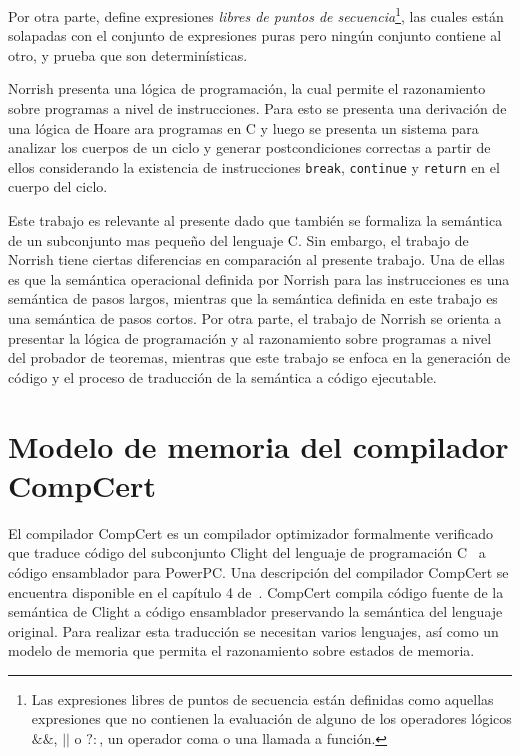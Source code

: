 Por otra parte, define expresiones \textit{libres de puntos de secuencia}\footnote{Las expresiones libres de puntos de secuencia están definidas como aquellas expresiones que no contienen la evaluación de alguno de los operadores lógicos $\&\&$, $||$ o $?:$, un operador coma o una llamada a función.}, las cuales están solapadas con el conjunto de expresiones puras pero ningún conjunto contiene al otro, y prueba que son determinísticas.

Norrish presenta una lógica de programación, la cual permite el razonamiento sobre programas a nivel de instrucciones.
Para esto se presenta una derivación de una lógica de Hoare ara programas en C y luego se presenta un sistema para analizar los cuerpos de un ciclo y generar postcondiciones correctas a partir de ellos considerando la existencia de instrucciones \verb|break|, \verb|continue| y \verb|return| en el cuerpo del ciclo.

Este trabajo es relevante al presente dado que también se formaliza la semántica de un subconjunto mas pequeño del lenguaje C.
Sin embargo, el trabajo de Norrish tiene ciertas diferencias en comparación al presente trabajo.
Una de ellas es que la semántica operacional definida por Norrish para las instrucciones es una semántica de pasos largos, mientras que la semántica definida en este trabajo es una semántica de pasos cortos.
Por otra parte, el trabajo de Norrish se orienta a presentar la lógica de programación y al razonamiento sobre programas a nivel del probador de teoremas, mientras que este trabajo se enfoca en la generación de código y el proceso de traducción de la semántica a código ejecutable.

\section{Modelo de memoria del compilador CompCert}

El compilador CompCert es un compilador optimizador formalmente verificado que traduce código del subconjunto Clight del lenguaje de programación C~\citep{clight} a código ensamblador para PowerPC.
Una descripción del compilador CompCert se encuentra disponible en el capítulo 4 de~\cite{compcert-float-point}.
CompCert compila código fuente de la semántica de Clight a código ensamblador preservando la semántica del lenguaje original.
Para realizar esta traducción se necesitan varios lenguajes, así como un modelo de memoria que permita el razonamiento sobre estados de memoria.

